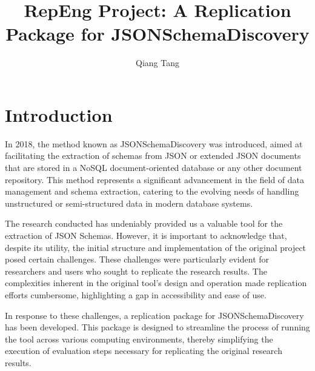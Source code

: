\documentclass[sigconf, nonacm]{acmart}
\begin{document}
\title{RepEng Project: A Replication Package for JSONSchemaDiscovery}


\author{Qiang Tang}

\maketitle


\section{Introduction}

In 2018, the method known as JSONSchemaDiscovery\cite{jsonschema} was introduced, aimed at facilitating the extraction of schemas from JSON or extended JSON documents that are stored in a NoSQL document-oriented database or any other document repository. This method represents a significant advancement in the field of data management and schema extraction, catering to the evolving needs of handling unstructured or semi-structured data in modern database systems.

The research conducted has undeniably provided us a valuable tool for the extraction of JSON Schemas. However, it is important to acknowledge that, despite its utility, the initial structure and implementation of the original project posed certain challenges. These challenges were particularly evident for researchers and users who sought to replicate the research results. The complexities inherent in the original tool's design and operation made replication efforts cumbersome, highlighting a gap in accessibility and ease of use.

In response to these challenges, a replication package for JSONSchemaDiscovery has been developed. This package is designed to streamline the process of running the tool across various computing environments, thereby simplifying the execution of evaluation steps necessary for replicating the original research results.
\end{document}
